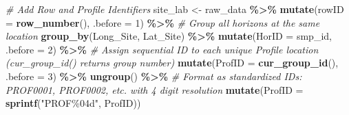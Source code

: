 \documentclass[
  10pt,
  b5paper,
  oneside]{book}
\newenvironment{Shaded}{\begin{snugshade}}{\end{snugshade}}
\newcommand{\AttributeTok}[1]{\textcolor[rgb]{0.13,0.29,0.53}{#1}}
\newcommand{\CommentTok}[1]{\textcolor[rgb]{0.56,0.35,0.01}{\textit{#1}}}
\newcommand{\DecValTok}[1]{\textcolor[rgb]{0.00,0.00,0.81}{#1}}
\newcommand{\FunctionTok}[1]{\textcolor[rgb]{0.13,0.29,0.53}{\textbf{#1}}}
\newcommand{\NormalTok}[1]{#1}
\newcommand{\OtherTok}[1]{\textcolor[rgb]{0.56,0.35,0.01}{#1}}
\newcommand{\SpecialCharTok}[1]{\textcolor[rgb]{0.81,0.36,0.00}{\textbf{#1}}}
\newcommand{\StringTok}[1]{\textcolor[rgb]{0.31,0.60,0.02}{#1}}
\begin{document}
\begin{Shaded}
\begin{Highlighting}[]
\CommentTok{\# Add Row and Profile Identifiers}
\NormalTok{site\_lab }\OtherTok{\textless{}{-}}\NormalTok{ raw\_data }\SpecialCharTok{\%\textgreater{}\%}
  \FunctionTok{mutate}\NormalTok{(}\AttributeTok{rowID =} \FunctionTok{row\_number}\NormalTok{(), }\AttributeTok{.before =} \DecValTok{1}\NormalTok{) }\SpecialCharTok{\%\textgreater{}\%}
  \CommentTok{\# Group all horizons at the same location}
  \FunctionTok{group\_by}\NormalTok{(Long\_Site, Lat\_Site) }\SpecialCharTok{\%\textgreater{}\%}
  \FunctionTok{mutate}\NormalTok{(}\AttributeTok{HorID =}\NormalTok{ smp\_id, }\AttributeTok{.before =} \DecValTok{2}\NormalTok{) }\SpecialCharTok{\%\textgreater{}\%}
  \CommentTok{\# Assign sequential ID to each unique Profile location (cur\_group\_id() returns group number)}
  \FunctionTok{mutate}\NormalTok{(}\AttributeTok{ProfID =} \FunctionTok{cur\_group\_id}\NormalTok{(), }\AttributeTok{.before =} \DecValTok{3}\NormalTok{) }\SpecialCharTok{\%\textgreater{}\%}
  \FunctionTok{ungroup}\NormalTok{() }\SpecialCharTok{\%\textgreater{}\%}
  \CommentTok{\# Format as standardized IDs: PROF0001, PROF0002, etc. with 4 digit resolution}
  \FunctionTok{mutate}\NormalTok{(}\AttributeTok{ProfID =} \FunctionTok{sprintf}\NormalTok{(}\StringTok{"PROF\%04d"}\NormalTok{, ProfID))}


\end{Highlighting}
\end{Shaded}
\end{document}
